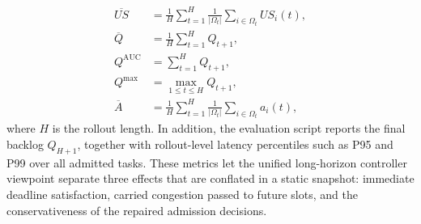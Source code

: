 \documentclass[pdflatex,sn-mathphys-num]{sn-jnl}
\begin{document}
\begin{align}
    \overline{US} &= \frac{1}{H}\sum_{t=1}^{H}\frac{1}{|\Omega_t|}\sum_{i \in \Omega_t} US_i(t),\\
    \overline{Q} &= \frac{1}{H}\sum_{t=1}^{H} Q_{t+1},\\
    Q^{\mathrm{AUC}} &= \sum_{t=1}^{H} Q_{t+1},\\
    Q^{\max} &= \max_{1 \le t \le H} Q_{t+1},\\
    \overline{A} &= \frac{1}{H}\sum_{t=1}^{H}\frac{1}{|\Omega_t|}\sum_{i \in \Omega_t} a_i(t),
\end{align}
where $H$ is the rollout length. In addition, the evaluation script reports the final backlog $Q_{H+1}$, together with rollout-level latency percentiles such as P95 and P99 over all admitted tasks. These metrics let the unified long-horizon controller viewpoint separate three effects that are conflated in a static snapshot: immediate deadline satisfaction, carried congestion passed to future slots, and the conservativeness of the repaired admission decisions.
\end{document}
